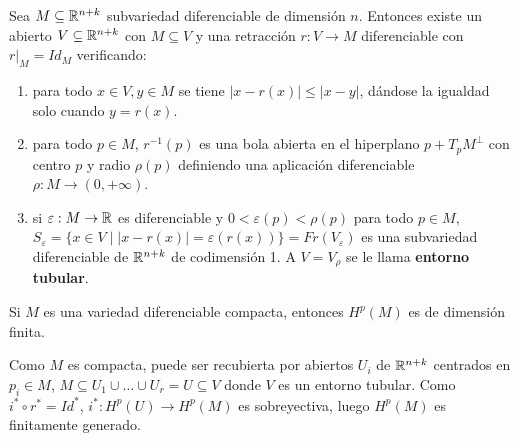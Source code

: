 \documentclass[CV.tex]{subfiles}
\begin{document}
\begin{teorema}

Sea $M\subseteq\mathbb{R}^{n+k}$ subvariedad diferenciable de dimensión $n$. Entonces existe un abierto $V\subseteq\mathbb{R}^{n+k}$ con $M\subseteq V$ y una retracción $r:V\to M$ diferenciable con $r|_M=Id_M$ verificando:
\begin{enumerate}
\item para todo $x\in V, y\in M$ se tiene $|x-r(x)|\leq|x-y|$, dándose la igualdad solo cuando $y=r(x)$. 
\item para todo $p\in M$, $r^{-1}(p)$ es una bola abierta en el hiperplano $p+T_pM^{\perp}$ con centro $p$ y radio $\rho(p)$ definiendo una aplicación diferenciable $\rho:M\to (0,+\infty)$. 
\item si $\varepsilon:M\to\mathbb{R}$ es diferenciable y $0<\varepsilon(p)<\rho(p)$ para todo $p\in M$, $S_{\varepsilon}=\{x\in V\mid |x-r(x)|=\varepsilon(r(x))\}=Fr(V_{\varepsilon})$ es una subvariedad diferenciable de $\mathbb{R}^{n+k}$ de codimensión 1.  A $V=V_\rho$ se le llama \textbf{entorno tubular}.
\end{enumerate}
\end{teorema}


\begin{prop}
Si $M$ es una variedad diferenciable compacta, entonces $H^p(M)$ es de dimensión finita.
\end{prop}
\begin{dem}
Como $M$ es compacta, puede ser recubierta por abiertos $U_i$ de $\mathbb{R}^{n+k}$ centrados en $p_i\in M$, $M\subseteq U_1\cup\dots\cup U_r=U\subseteq V$ donde $V$ es un entorno tubular. Como $i^*\circ r^*=Id^*$, $i^*:H^p(U)\to H^p(M)$ es sobreyectiva, luego $H^p(M)$ es finitamente generado. 

\QED
\end{dem}
\end{document}
